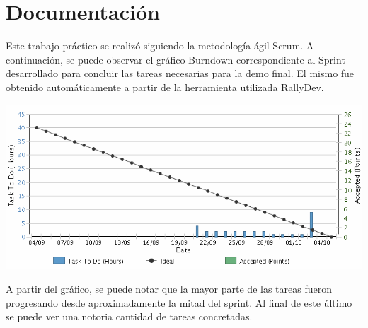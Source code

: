 \section{Documentación}

Este trabajo práctico se realizó siguiendo la metodología ágil Scrum.
A continuación, se puede observar el gráfico Burndown correspondiente al Sprint
desarrollado para concluir las tareas necesarias para la demo final.
El mismo fue obtenido automáticamente a partir de la herramienta utilizada RallyDev.
\newline


\centerline{\includegraphics[width=1\textwidth]{./imagenes/burndown.png}}



A partir del gráfico, se puede notar que la mayor parte de las tareas fueron progresando
desde aproximadamente la mitad del sprint. Al final de este último se puede ver una notoria 
cantidad de tareas concretadas.